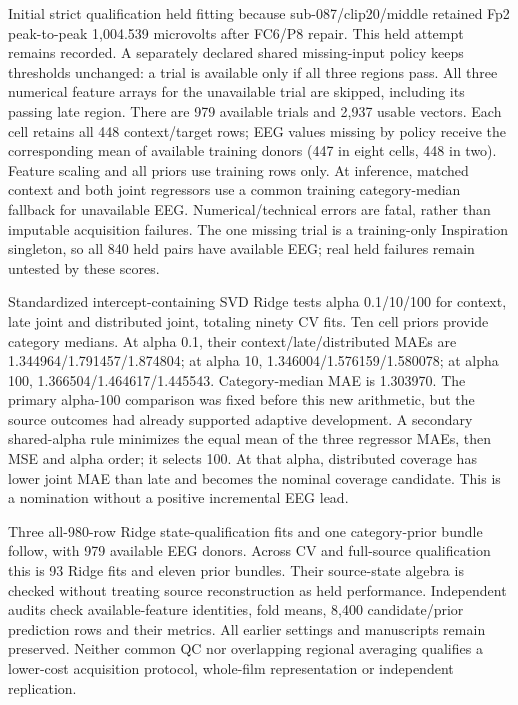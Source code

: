\documentclass[10pt,a4paper]{article}
\begin{document}
Initial strict qualification held fitting because sub-087/clip20/middle retained Fp2 peak-to-peak 1,004.539 microvolts after FC6/P8 repair. This held attempt remains recorded. A separately declared shared missing-input policy keeps thresholds unchanged: a trial is available only if all three regions pass. All three numerical feature arrays for the unavailable trial are skipped, including its passing late region. There are 979 available trials and 2,937 usable vectors. Each cell retains all 448 context/target rows; EEG values missing by policy receive the corresponding mean of available training donors (447 in eight cells, 448 in two). Feature scaling and all priors use training rows only. At inference, matched context and both joint regressors use a common training category-median fallback for unavailable EEG. Numerical/technical errors are fatal, rather than imputable acquisition failures. The one missing trial is a training-only Inspiration singleton, so all 840 held pairs have available EEG; real held failures remain untested by these scores.

Standardized intercept-containing SVD Ridge tests alpha 0.1/10/100 for context, late joint and distributed joint, totaling ninety CV fits. Ten cell priors provide category medians. At alpha 0.1, their context/late/distributed MAEs are 1.344964/1.791457/1.874804; at alpha 10, 1.346004/1.576159/1.580078; at alpha 100, 1.366504/1.464617/1.445543. Category-median MAE is 1.303970. The primary alpha-100 comparison was fixed before this new arithmetic, but the source outcomes had already supported adaptive development. A secondary shared-alpha rule minimizes the equal mean of the three regressor MAEs, then MSE and alpha order; it selects 100. At that alpha, distributed coverage has lower joint MAE than late and becomes the nominal coverage candidate. This is a nomination without a positive incremental EEG lead.

Three all-980-row Ridge state-qualification fits and one category-prior bundle follow, with 979 available EEG donors. Across CV and full-source qualification this is 93 Ridge fits and eleven prior bundles. Their source-state algebra is checked without treating source reconstruction as held performance. Independent audits check available-feature identities, fold means, 8,400 candidate/prior prediction rows and their metrics. All earlier settings and manuscripts remain preserved. Neither common QC nor overlapping regional averaging qualifies a lower-cost acquisition protocol, whole-film representation or independent replication.
\end{document}
